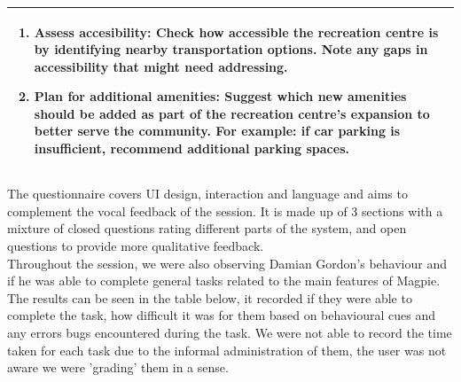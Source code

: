 \begin{table}[h!]
\begin{tabular}{|p{}|}
\begin{enumerate}
            \item \textbf{Assess accesibility:} Check how accessible the recreation centre is by identifying nearby transportation options. Note any gaps in accessibility that might need addressing.
            \item \textbf{Plan for additional amenities:} Suggest which new amenities should be added as part of the recreation centre's expansion to better serve the community. For example: if car parking is insufficient, recommend additional parking spaces.
        \end{enumerate}                                              \\
        \hline
    \end{tabular}
\end{table}

\noindent The questionnaire covers UI design, interaction and language and aims to complement the vocal feedback of the session. It is made up of 3 sections with a mixture of closed questions rating different parts of the system, and open questions to provide more qualitative feedback.\\

\noindent Throughout the session, we were also observing Damian Gordon's behaviour and if he was able to complete general tasks related to the main features of Magpie. The results can be seen in the table below, it recorded if they were able to complete the task, how difficult it was for them based on behavioural cues and any errors bugs encountered during the task. We were not able to record the time taken for each task due to the informal administration of them, the user was not aware we were 'grading' them in a sense.\\\\

